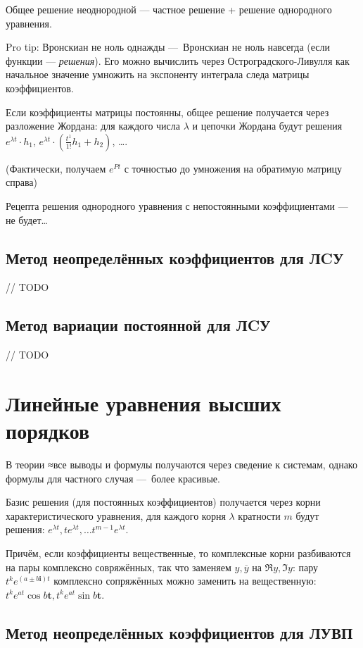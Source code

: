 \documentclass[12pt, a4paper]{article}
\begin{document}
Общее решение неоднородной — частное решение + решение однородного уравнения.

Pro tip: Вронскиан не ноль однажды — Вронскиан не ноль навсегда (если функции — \textit{решения}).
Его можно вычислить через Остроградского-Ливулля как начальное значение умножить на экспоненту интеграла следа матрицы коэффициентов.

Если коэффициенты матрицы постоянны, общее решение получается через разложение Жордана: для каждого числа $\lambda$ и цепочки Жордана будут решения
$e^{\lambda t} \cdot h_1$, $e^{\lambda t} \cdot (\frac{t^{1}}{1!} h_1 + h_2)$, ….

(Фактически, получаем $e^{Pt}$ с точностью до умножения на обратимую матрицу справа)

Рецепта решения однородного уравнения с непостоянными коэффициентами — не будет…

\subsection{Метод неопределённых коэффициентов для ЛCУ}

// TODO

\subsection{Метод вариации постоянной для ЛCУ}

// TODO

\section{Линейные уравнения высших порядков}

В теории ≈все выводы и формулы получаются через сведение к системам, 
однако формулы для частного случая — более красивые.


Базис решения (для постоянных коэффициентов) получается через корни характеристического уравнения, 
для каждого корня $\lambda$ кратности $m$ будут решения: $e^{\lambda t}, te^{\lambda t}, … t^{m - 1} e^{\lambda t}$.

Причём, если коэффициенты вещественные, то комплексные корни разбиваются на пары комплексно совряжённых, 
так что заменяем $y, \overline{y}$ на $\Re y, \Im y$: пару $t^k e^{(a ± b\mathbf{i})t}$ комплексно сопряжённых можно заменить на вещественную:
$t^k e^{at} \cos b\mathbf{t}, t^k e^{at} \sin b\mathbf{t}$.


\subsection{Метод неопределённых коэффициентов для ЛУВП}
\end{document}
